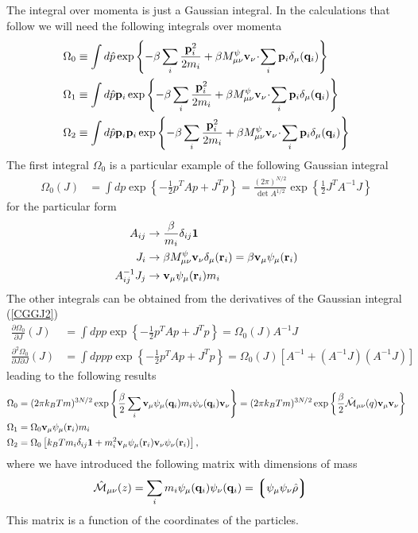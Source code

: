 \documentclass[b5paper,openright,10pt]{book}
\newcommand{\esc}{\!\cdot\!}
\newcommand{\llg}{\left\lgroup}
\newcommand{\rlg}{\right\rgroup}
\begin{document}
\begin{appendices}
The  integral  over  momenta  is  just a  Gaussian  integral.  In  the
calculations that  follow we  will need  the following  integrals over
momenta
\begin{align}
\Omega_0&\equiv  \int d\hat{p}
\exp\left\{-\beta\sum_i\frac{{\bf p}_i^2}{2m_i}+\beta M^\psi_{\mu\nu}{\bf v}_\nu\esc\sum_i{\bf p}_i\delta_\mu({\bf q}_i)\right\}
\nonumber\\
\Omega_1&\equiv\int d\hat{p} {\bf p}_i
\exp\left\{-\beta\sum_i\frac{{\bf p}_i^2}{2m_i}+\beta M^\psi_{\mu\nu}{\bf v}_\nu\esc\sum_i{\bf p}_i\delta_\mu({\bf q}_i)\right\}
\nonumber\\
\Omega_2&\equiv\int d\hat{p} {\bf p}_i{\bf p}_i
\exp\left\{-\beta\sum_i\frac{{\bf p}_i^2}{2m_i}+\beta M^\psi_{\mu\nu}{\bf v}_\nu\esc\sum_i{\bf p}_i\delta_\mu({\bf q}_i)\right\}
\end{align}
The first integral $\Omega_0$ is   a particular  example  of the  following
Gaussian integral
\begin{align}
  \Omega_0(J)&= \int dp \exp\left\{-\frac{1}{2}p^T Ap+J^Tp\right\}
=\frac{(2\pi)^{N/2}}{\det A^{1/2}}
\exp\left\{\frac{1}{2}J^TA^{-1}J\right\}
\label{CGGJ2}
\end{align}
for the particular form 
\begin{align}
  A_{ij}&\to \frac{\beta}{m_i}\delta_{ij}{\bf 1}
\nonumber\\
J_i&\to \beta M^\psi_{\mu\nu}{\bf v}_\nu\delta_\mu({\bf r}_i)=\beta {\bf v}_\mu\psi_\mu({\bf r}_i)
\nonumber\\
A_{ij}^{-1}J_j&\to {\bf v}_\mu\psi_\mu({\bf r}_i)m_i
\end{align}
The other integrals can  be  obtained  from  the
derivatives of the Gaussian integral (\ref{CGGJ2})
\begin{align}
\frac{\partial  \Omega_0}{\partial J}(J)
& = \int dp p \exp\left\{-\frac{1}{2}p^T Ap+J^Tp\right\}
=\Omega_0(J) A^{-1}J
\nonumber\\
\frac{\partial^2  \Omega_0}{\partial J\partial J}(J)
&= \int dp pp \exp\left\{-\frac{1}{2}p^T Ap+J^Tp\right\}
=\Omega_0(J)\left[A^{-1}+ (A^{-1}J) (A^{-1}J)\right]
\label{CGGJ3}
\end{align}
leading to the following results
\begin{align}
  \Omega_0 &=(2\pi k_BTm)^{3N/2}\exp\left\{\frac{\beta}{2}\sum_i{\bf v}_\mu\psi_\mu({\bf q}_i)m_i
\psi_\nu({\bf q}_i){\bf v}_\nu\right\}=
(2\pi k_BTm)^{3N/2}\exp\left\{\frac{\beta}{2}\hat{\cal M}_{\mu\nu}(q){\bf v}_\mu{\bf v}_\nu\right\}
\nonumber\\
  \Omega_1 &=\Omega_0  {\bf v}_\mu\psi_\mu({\bf r}_i)m_i
\nonumber\\
  \Omega_2 &=\Omega_0\left[k_BTm_i\delta_{ij}{\bf 1}+m_i^2{\bf v}_\mu\psi_\mu({\bf r}_i) {\bf v}_\nu\psi_\nu({\bf r}_i)\right],
\label{Omegas}
\end{align}
where we have introduced the following matrix with dimensions of mass
\begin{align}
  \hat{\cal M}_{\mu\nu}(z)&=\sum_im_i\psi_\mu({\bf q}_i)\psi_\nu({\bf q}_i)=\llg\psi_\mu\psi_\nu\hat{\rho}\rlg
\label{calM}
\end{align}
This matrix is a  function of  the coordinates  of the  particles.   


\end{appendices}
\end{document}
